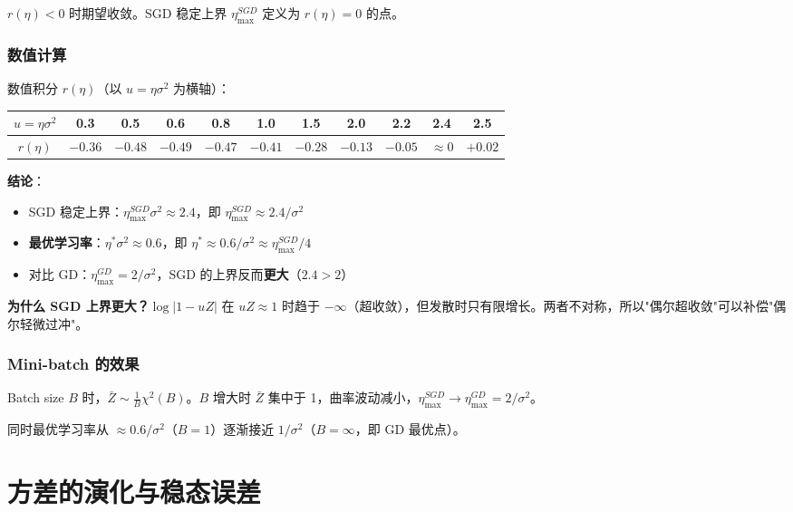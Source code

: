 \documentclass[12pt, a4paper]{ctexart}
\begin{document}
$r(\eta) < 0$ 时期望收敛。SGD 稳定上界 $\eta_{\max}^{SGD}$ 定义为 $r(\eta) = 0$ 的点。

\subsubsection{数值计算}

数值积分 $r(\eta)$（以 $u = \eta\sigma^2$ 为横轴）：

\begin{center}
\begin{tabular}{c|cccccccccc}
$u = \eta\sigma^2$ & 0.3 & 0.5 & 0.6 & 0.8 & 1.0 & 1.5 & 2.0 & 2.2 & 2.4 & 2.5 \\
\hline
$r(\eta)$ & $-0.36$ & $-0.48$ & $\mathbf{-0.49}$ & $-0.47$ & $-0.41$ & $-0.28$ & $-0.13$ & $-0.05$ & $\approx 0$ & $+0.02$
\end{tabular}
\end{center}

\textbf{结论}：
\begin{itemize}
    \item SGD 稳定上界：$\eta_{\max}^{SGD}\sigma^2 \approx 2.4$，即 $\eta_{\max}^{SGD} \approx 2.4/\sigma^2$
    \item \textbf{最优学习率}：$\eta^*\sigma^2 \approx 0.6$，即 $\eta^* \approx 0.6/\sigma^2 \approx \eta_{\max}^{SGD}/4$
    \item 对比 GD：$\eta_{\max}^{GD} = 2/\sigma^2$，SGD 的上界反而\textbf{更大}（$2.4 > 2$）
\end{itemize}

\textbf{为什么 SGD 上界更大？}$\log|1-uZ|$ 在 $uZ \approx 1$ 时趋于 $-\infty$（超收敛），但发散时只有限增长。两者不对称，所以"偶尔超收敛"可以补偿"偶尔轻微过冲"。

\subsubsection{Mini-batch 的效果}

Batch size $B$ 时，$\bar{Z} \sim \frac{1}{B}\chi^2(B)$。$B$ 增大时 $\bar{Z}$ 集中于 1，曲率波动减小，$\eta_{\max}^{SGD} \to \eta_{\max}^{GD} = 2/\sigma^2$。

同时最优学习率从 $\approx 0.6/\sigma^2$（$B=1$）逐渐接近 $1/\sigma^2$（$B=\infty$，即 GD 最优点）。


\section{方差的演化与稳态误差}
\end{document}
